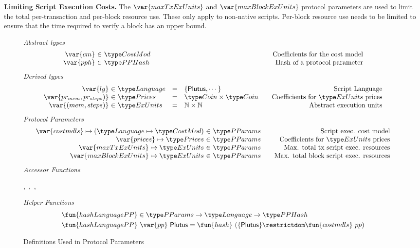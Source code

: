 \textbf{Limiting Script Execution Costs.}
The $\var{maxTxExUnits}$ and $\var{maxBlockExUnits}$ protocol parameters are
used to limit the total per-transaction and per-block resource use. These only apply to non-native scripts.
Per-block resource use needs to be limited to ensure that the time required to verify a block has an upper bound.

\begin{figure*}[htb]
  \emph{Abstract types}
  \begin{equation*}
    \begin{array}{r@{~\in~}l@{\qquad\qquad\qquad\qquad\qquad\qquad\qquad\qquad\qquad}r}
      \var{cm} & \CostMod & \text{Coefficients for the cost model} \\
      \var{pph} & \PPHash & \text{Hash of a protocol parameter}
    \end{array}
  \end{equation*}
  \emph{Derived types}
  \begin{equation*}
    \begin{array}{r@{~\in~}l@{\quad=\quad}l@{\qquad}r}
      \var{lg}
      & \Language
      & \{\Plutus, \dotsb\}
      & \text{Script Language}
      \\
      \var{pr_{mem}, pr_{steps})}
      & \Prices
      & \Coin \times \Coin
      & \text {Coefficients for $\ExUnits$ prices}
      \\
      \var{(mem, steps)}
      & \ExUnits
      & \N \times \N
      & \text{Abstract execution units} \\
    \end{array}
  \end{equation*}
  \emph{Protocol Parameters}
  \begin{equation*}
      \begin{array}{r@{~\in~}l@{\qquad}r}
        \var{costmdls} \mapsto (\Language \mapsto \CostMod) & \PParams & \text{Script exec. cost model}\\
        \var{prices} \mapsto \Prices & \PParams & \text{Coefficients for $\ExUnits$ prices} \\
        \var{maxTxExUnits} \mapsto \ExUnits & \PParams & \text{Max. total tx script exec. resources}\\
        \var{maxBlockExUnits} \mapsto \ExUnits & \PParams & \text{Max. total block script exec. resources}\\
      \end{array}
  \end{equation*}
  \emph{Accessor Functions}
  \begin{center}
  ,~,~,~
  \end{center}
  \emph{Helper Functions}
  \begin{align*}
    & \fun{hashLanguagePP} \in \PParams \to \Language \to \PPHash \\
    & \fun{hashLanguagePP}~\var{pp}~\Plutus = \fun{hash}~(\{\Plutus\} \restrictdom \fun{costmdls}~{pp})
  \end{align*}
  \caption{Definitions Used in Protocol Parameters}
  \label{fig:defs:protocol-parameters}
\end{figure*}
